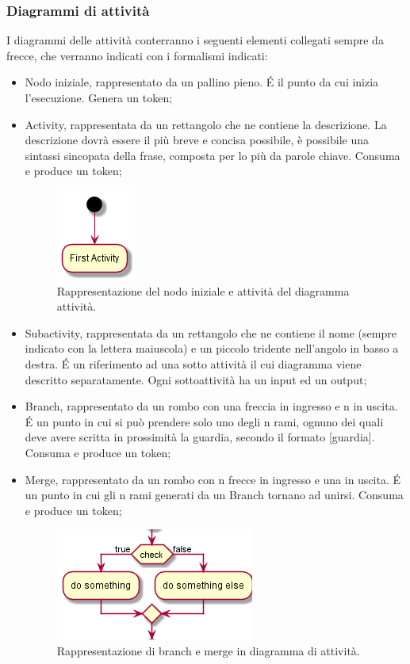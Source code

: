 \documentclass[NormeDiProgetto.tex]{subfiles}
\begin{document}
\subsubsection{Diagrammi di attività}
I diagrammi delle attività conterranno i seguenti elementi collegati sempre da frecce, che verranno indicati con i formalismi indicati:
\begin{itemize}
\item  Nodo iniziale, rappresentato da un pallino pieno. \'E il punto da cui inizia l'esecuzione. Genera un token;
\item  Activity, rappresentata da un rettangolo che ne contiene la descrizione. La descrizione dovrà essere il più breve e concisa possibile, è possibile una sintassi sincopata della frase, composta per lo più da parole chiave. Consuma e produce un token;
\begin{figure}[H]
	\centering
	\includegraphics[width=0.2\linewidth]{progettazione/activity}
	\caption{Rappresentazione del nodo iniziale e attività del diagramma attività.}
	\label{fig:activity}
\end{figure}

\item Subactivity, rappresentata da un rettangolo che ne contiene il nome (sempre indicato con la lettera maiuscola) e un piccolo tridente nell'angolo in basso a destra. \'E un riferimento ad una sotto attività il cui diagramma viene descritto separatamente. Ogni sottoattività ha un input ed un output;

\item Branch, rappresentato da un rombo con una freccia in ingresso e n in uscita. \'E
un punto in cui si può prendere solo uno degli n rami, ognuno dei quali deve avere
scritta in prossimità la guardia, secondo il formato [guardia]. Consuma e produce
un token;
\item Merge, rappresentato da un rombo con n frecce in ingresso e una in uscita. \'E
un punto in cui gli n rami generati da un Branch tornano ad unirsi. Consuma e produce un token;
\begin{figure}[H]
	\centering
	\includegraphics[width=0.4\linewidth]{progettazione/activitybranch}
	\caption{Rappresentazione di branch e merge in diagramma di attività.}
	\label{fig:activitybranch}
\end{figure}


\end{itemize}
\end{document}
